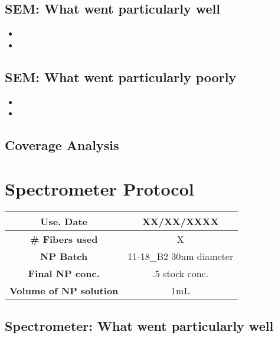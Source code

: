 
\subsection{SEM: {\color{blue} What went particularly well}}


\begin{itemize}
\item{}
\item{}
\end{itemize}

\subsection{SEM: {\color{red} What went particularly poorly}}

\begin{itemize}
\item{}
\item{}
\end{itemize}

\subsection{Coverage Analysis}


\section{Spectrometer Protocol}

\begin{center}
\begin{tabular}{| c | c |}
 \hline
 {\bf Use. Date} & XX/XX/XXXX \\ \hline
 {\bf \# Fibers used} & X \\ \hline
 {\bf NP Batch} & 11-18\_B2 30nm diameter \\ \hline
 {\bf Final NP conc.} & .5 stock conc.  \\ \hline
 {\bf Volume of NP solution} & 1mL \\ \hline
\end{tabular}
\end{center}

\vspace{.3cm}


\subsection{Spectrometer: {\color{blue} What went particularly well}}

